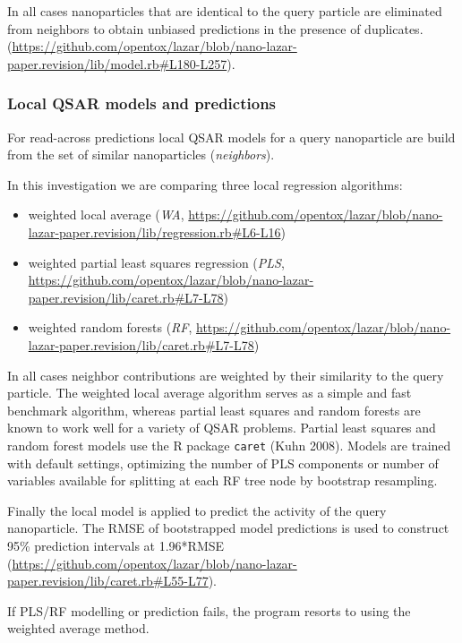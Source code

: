 \documentclass[utf8]{frontiersHLTH} %
\providecommand{\tightlist}{%
  \setlength{\itemsep}{0pt}\setlength{\parskip}{0pt}}
\begin{document}
In all cases nanoparticles that are identical to the query particle are
eliminated from neighbors to obtain unbiased predictions in the presence
of duplicates.
(\url{https://github.com/opentox/lazar/blob/nano-lazar-paper.revision/lib/model.rb\#L180-L257}).

\subsubsection{Local QSAR models and
predictions}\label{local-qsar-models-and-predictions}

For read-across predictions local QSAR models for a query nanoparticle
are build from the set of similar nanoparticles (\emph{neighbors}).

In this investigation we are comparing three local regression
algorithms:

\begin{itemize}
\tightlist
\item
  weighted local average (\emph{WA},
  \url{https://github.com/opentox/lazar/blob/nano-lazar-paper.revision/lib/regression.rb\#L6-L16})
\item
  weighted partial least squares regression (\emph{PLS},
  \url{https://github.com/opentox/lazar/blob/nano-lazar-paper.revision/lib/caret.rb\#L7-L78})
\item
  weighted random forests (\emph{RF},
  \url{https://github.com/opentox/lazar/blob/nano-lazar-paper.revision/lib/caret.rb\#L7-L78})
\end{itemize}

In all cases neighbor contributions are weighted by their similarity to
the query particle. The weighted local average algorithm serves as a
simple and fast benchmark algorithm, whereas partial least squares and
random forests are known to work well for a variety of QSAR problems.
Partial least squares and random forest models use the R package
\texttt{caret} (Kuhn 2008). Models are trained with default settings,
optimizing the number of PLS components or number of variables available
for splitting at each RF tree node by bootstrap resampling.

Finally the local model is applied to predict the activity of the query
nanoparticle. The RMSE of bootstrapped model predictions is used to
construct 95\% prediction intervals at 1.96*RMSE
(\url{https://github.com/opentox/lazar/blob/nano-lazar-paper.revision/lib/caret.rb\#L55-L77}).

If PLS/RF modelling or prediction fails, the program resorts to using
the weighted average method.
\end{document}
